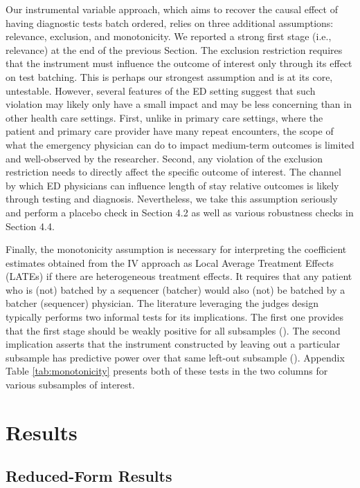 \documentclass[,,nonblindrev]{informs}
\begin{document}
Our instrumental variable approach, which aims to recover the causal
effect of having diagnostic tests batch ordered, relies on three
additional assumptions: relevance, exclusion, and monotonicity. We
reported a strong first stage (i.e., relevance) at the end of the
previous Section. The exclusion restriction requires that the instrument
must influence the outcome of interest only through its effect on test
batching. This is perhaps our strongest assumption and is at its core,
untestable. However, several features of the ED setting suggest that
such violation may likely only have a small impact and may be less
concerning than in other health care settings. First, unlike in primary
care settings, where the patient and primary care provider have many
repeat encounters, the scope of what the emergency physician can do to
impact medium-term outcomes is limited and well-observed by the
researcher. Second, any violation of the exclusion restriction needs to
directly affect the specific outcome of interest. The channel by which
ED physicians can influence length of stay relative outcomes is likely
through testing and diagnosis. Nevertheless, we take this assumption
seriously and perform a placebo check in Section 4.2 as well as various
robustness checks in Section 4.4.

Finally, the monotonicity assumption is necessary for interpreting the
coefficient estimates obtained from the IV approach as Local Average
Treatment Effects (LATEs) if there are heterogeneous treatment effects.
It requires that any patient who is (not) batched by a sequencer
(batcher) would also (not) be batched by a batcher (sequencer)
physician. The literature leveraging the judges design typically
performs two informal tests for its implications. The first one provides
that the first stage should be weakly positive for all subsamples
(\citet{dobbie2018effects}). The second implication asserts that the
instrument constructed by leaving out a particular subsample has
predictive power over that same left-out subsample
(\citet{bhuller2020incarceration}). Appendix Table
\ref{tab:monotonicity} presents both of these tests in the two columns
for various subsamples of interest.

\hypertarget{sec:4}{%
\section{Results}\label{sec:4}}

\hypertarget{reduced-form-results}{%
\subsection{Reduced-Form Results}\label{reduced-form-results}}
\end{document}
